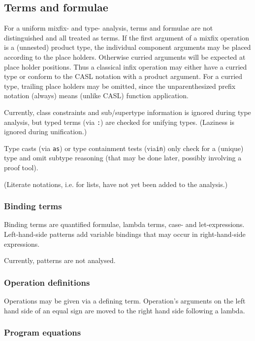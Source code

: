 \documentclass{article}
\begin{document}
\subsection{Terms and formulae}

For a uniform mixfix- and type- analysis, terms and formulae are not
distinguished and all treated as terms. If the first argument of a mixfix
operation is a (unnested) product type, the individual component arguments may
be placed according to the place holders. Otherwise curried arguments will be
expected at place holder positions. Thus a classical infix operation may
either have a curried type or conform to the CASL notation with a product
argument. For a curried type, trailing place holders may be omitted, since the
unparenthesized prefix notation (always) means (unlike CASL) function
application.

Currently, class constraints and sub/supertype information is ignored during
type analysis, but typed terms (via \texttt{:}) are checked for unifying
types. (Laziness is ignored during unification.)

Type casts (via \texttt{as}) or type containment tests (via\texttt{in})
only check for a (unique) type and omit subtype reasoning (that may be done
later, possibly involving a proof tool).

(Literate notations, i.e. for lists, have not yet been added to the analysis.)

\subsubsection{Binding terms}

Binding terms are quantified formulae, lambda terms, case- and
let-expressions. Left-hand-side patterns add variable bindings that may
occur in right-hand-side expressions. 

Currently, patterns are not analysed.

\subsubsection{Operation definitions}

Operations may be given via a defining term. Operation's arguments on the left
hand side of an equal sign are moved to the right hand side following a
lambda.

\subsubsection{Program equations}
\end{document}
